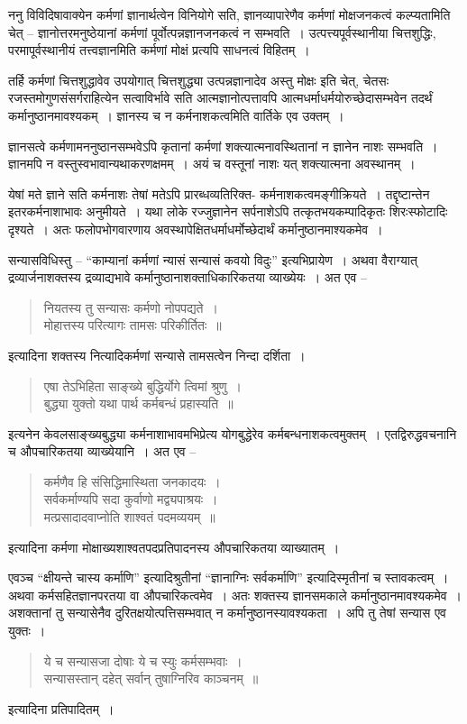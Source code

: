 {ननु विविदिषावाक्येन कर्मणां ज्ञानार्थत्वेन विनियोगे सति, ज्ञानव्यापारेणैव कर्मणां मोक्षजनकत्वं कल्प्यतामिति चेत् – ज्ञानोत्तरमनुष्ठेयानां कर्मणां पूर्वोत्पन्नज्ञानजनकत्वं न सम्भवति~। उत्पत्त्यपूर्वस्थानीया चित्तशुद्धिः, परमापूर्वस्थानीयं तत्त्वज्ञानमिति कर्मणां मोक्षं प्रत्यपि साधनत्वं विहितम्~। 

तर्हि कर्मणां चित्तशुद्धावेव उपयोगात् चित्तशुद्ध्या उत्पन्नज्ञानादेव अस्तु मोक्षः इति चेत्, चेतसः रजस्तमोगुणसंसर्गराहित्येन सत्वाविर्भावे सति आत्मज्ञानोत्पत्तावपि आत्मधर्माधर्मयोरुच्छेदासम्भवेन तदर्थं कर्मानुष्ठानमावश्यकम्~। ज्ञानस्य च न कर्मनाशकत्वमिति वार्तिके एव उक्तम्~। 

ज्ञानसत्वे कर्मणामननुष्ठानसम्भवेऽपि कृतानां कर्मणां शक्त्यात्मनावस्थितानां न ज्ञानेन नाशः सम्भवति~। ज्ञानमपि न वस्तुस्वभावान्यथाकरणक्षमम्~। अयं च वस्तूनां नाशः यत् शक्त्यात्मना अवस्थानम्~। 

येषां मते ज्ञाने सति कर्मनाशः तेषां मतेऽपि प्रारब्धव्यतिरिक्त- कर्मनाशकत्वमङ्गीक्रियते~। तद्दृष्टान्तेन इतरकर्मनाशाभावः अनुमीयते~। यथा लोके रज्जुज्ञानेन सर्पनाशेऽपि तत्कृतभयकम्पादिकृतः शिरःस्फोटादिः दृश्यते~। अतः फलोपभोगवारणाय अवस्थापेक्षितधर्माधर्मोच्छेदार्थं कर्मानुष्ठानमाश्यकमेव~। 

सन्यासविधिस्तु – “काम्यानां कर्मणां न्यासं सन्यासं कवयो विदुः” इत्यभिप्रायेण~। अथवा वैराग्यात् द्रव्यार्जनाशक्तस्य द्रव्याद्यभावे कर्मानुष्ठानाशक्ताधिकारिकतया व्याख्येयः~। 	अत एव –
\begin{verse}
नियतस्य तु सन्यासः कर्मणो नोपपद्यते~। \\
मोहात्तस्य परित्यागः तामसः परिकीर्तितः~॥
\end{verse}
इत्यादिना शक्तस्य नित्यादिकर्मणां सन्यासे तामसत्वेन निन्दा दर्शिता~। 		
\begin{verse}
एषा तेऽभिहिता साङ्ख्ये बुद्धिर्योगे त्विमां श्रुणु~। \\
बुद्ध्या युक्तो यथा पार्थ कर्मबन्धं प्रहास्यति~॥
\end{verse}
इत्यनेन केवलसाङ्ख्यबुद्ध्या कर्मनाशाभावमभिप्रेत्य योगबुद्धेरेव कर्मबन्धनाशकत्वमुक्तम्~। एतद्विरुद्धवचनानि च औपचारिकतया व्याख्येयानि~। अत एव –
\begin{verse}
कर्मणैव हि संसिद्धिमास्थिता जनकादयः~। \\
सर्वकर्माण्यपि सदा कुर्वाणो मद्व्यपाश्रयः~। \\
मत्प्रसादादवाप्नोति शाश्वतं पदमव्ययम्~॥
\end{verse}
इत्यादिना कर्मणा मोक्षाख्यशाश्वतपदप्रतिपादनस्य औपचारिकतया व्याख्यातम्~। 

एवञ्च “क्षीयन्ते चास्य कर्माणि” इत्यादिश्रुतीनां “ज्ञानाग्निः सर्वकर्माणि” इत्यादिस्मृतीनां च स्तावकत्वम्~। अथवा कर्मसहितज्ञानपरतया वा औपचारिकत्वमेव~। अतः शक्तस्य ज्ञानसमकाले कर्मानुष्ठानमावश्यकमेव~। अशक्तानां तु सन्यासेनैव दुरितक्षयोत्पत्तिसम्भवात् न कर्मानुष्ठानस्यावश्यकता~। अपि तु तेषां सन्यास एव युक्तः~। 
\begin{verse}
ये च सन्यासजा दोषाः ये च स्युः कर्मसम्भवाः~। \\
सन्यासस्तान् दहेत् सर्वान् तुषाग्निरिव काञ्चनम्~॥
\end{verse}
इत्यादिना प्रतिपादितम्~। 

}
